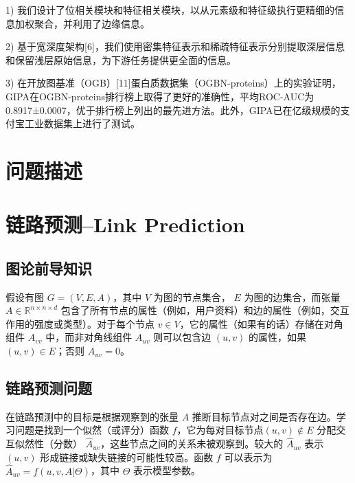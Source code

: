 \documentclass{article}
\begin{document}
1) 我们设计了位相关模块和特征相关模块，以从元素级和特征级执行更精细的信息加权聚合，并利用了边缘信息。

2) 基于宽深度架构[6]，我们使用密集特征表示和稀疏特征表示分别提取深层信息和保留浅层原始信息，为下游任务提供更全面的信息。

3) 在开放图基准（OGB）[11]蛋白质数据集（OGBN-proteins）上的实验证明，GIPA在OGBN-proteins排行榜上取得了更好的准确性，平均ROC-AUC为0.8917±0.0007，优于排行榜上列出的最先进方法。此外，GIPA已在亿级规模的支付宝工业数据集上进行了测试。
\section*{问题描述}


\section*{链路预测--Link Prediction}
\subsection*{图论前导知识}
假设有图 $G = (V, E, A)$，其中 $V$ 为图的节点集合，
$E$ 为图的边集合，而张量 $A \in \mathbb{R}^{n \times n \times d}$ 
包含了所有节点的属性（例如，用户资料）和边的属性（例如，交互作用的强度或类型）。对于每个节点 $v \in V$，它的属性（如果有的话）存储在对角组件 $A_{vv}$ 中，而非对角线组件 $A_{uv}$ 则可以包含边 $(u, v)$ 的属性，如果 $(u, v) \in E$；否则 $A_{uv} = 0$。
\subsection*{链路预测问题}
在链路预测中的目标是根据观察到的张量 $A$ 推断目标节点对之间是否存在边。学习问题是找到一个似然（或评分）函数 $f$，它为每对目标节点$(u, v) \notin E$ 分配交互似然性（分数） $\hat{A}_{uv}$，这些节点之间的关系未被观察到。较大的 $\hat{A}_{uv}$ 表示 $(u, v)$ 形成链接或缺失链接的可能性较高。函数 $f$ 可以表示为 $\hat{A}_{uv} = f(u, v, A|\Theta)$，其中 $\Theta$ 表示模型参数。
\end{document}
